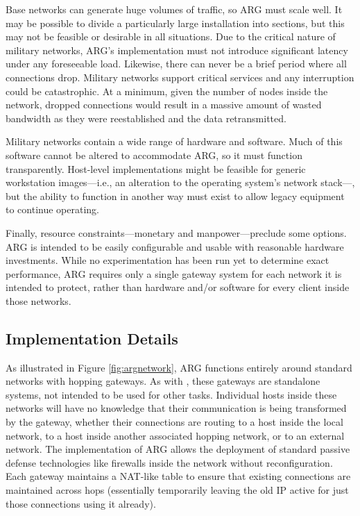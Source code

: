 \par Base networks can generate huge volumes of traffic, so ARG must scale well. It may be possible to divide a particularly large installation into sections, but this may not be feasible or desirable in all situations. Due to the critical nature of military networks, ARG's implementation must not introduce significant latency under any foreseeable load. Likewise, there can never be a brief period where all connections drop. Military networks support critical services and any interruption could be catastrophic. At a minimum, given the number of nodes inside the network, dropped connections would result in a massive amount of wasted bandwidth as they were reestablished and the data retransmitted.

\par Military networks contain a wide range of hardware and software. Much of this software cannot be altered to accommodate ARG, so it must function transparently. Host-level implementations might be feasible for generic workstation images---i.e., an alteration to the operating system's network stack---, but the ability to function in another way must exist to allow legacy equipment to continue operating.

\par Finally, resource constraints---monetary and manpower---preclude some options. ARG is intended to be easily configurable and usable with reasonable hardware investments. While no experimentation has been run yet to determine exact performance, ARG requires only a single gateway system for each network it is intended to protect, rather than hardware and/or software for every client inside those networks.

\subsection{Implementation Details}

\par As illustrated in Figure \ref{fig:argnetwork}, ARG functions entirely around standard networks with hopping gateways. As with \cite{TAO}, these gateways are standalone systems, not intended to be used for other tasks. Individual hosts inside these networks will have no knowledge that their communication is being transformed by the gateway, whether their connections are routing to a host inside the local network, to a host inside another associated hopping network, or to an external network. The implementation of ARG allows the deployment of standard passive defense technologies like firewalls inside the network without reconfiguration. Each gateway maintains a NAT-like table to ensure that existing connections are maintained across hops (essentially temporarily leaving the old IP active for just those connections using it already).

